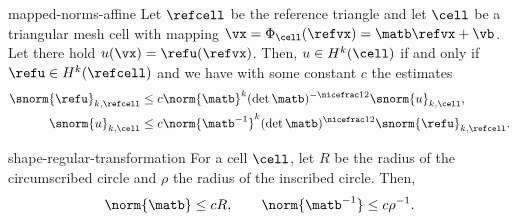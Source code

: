 \begin{Lemma}{mapped-norms-affine}
  Let $\refcell$ be the reference triangle and let $\cell$ be a
  triangular mesh cell with mapping
  $\vx = \Phi_\cell(\refvx) = \matb \refvx + \vb$. Let there hold
  $u(\vx) = \refu(\refvx)$. Then, $u\in H^k(\cell)$ if and only if
  $\refu\in H^k(\refcell)$ and we have with some constant $c$ the
  estimates
  \begin{gather}
    \begin{split}
      \snorm{\refu}_{k,\refcell}
      &\le c \norm{\matb}^k (\det \matb)^{-\nicefrac12}
      \snorm{u}_{k,\cell},\\
      \snorm{u}_{k,\cell}
      &\le c \norm{\matb^{-1}}^k (\det \matb)^{\nicefrac12}
      \snorm{\refu}_{k,\refcell}.
    \end{split}
  \end{gather}
\end{Lemma}

\begin{Lemma}{shape-regular-transformation}
  For a cell $\cell$, let $R$ be the radius of the circumscribed
  circle and $\rho$ the radius of the inscribed circle. Then,
  \begin{gather}
    \norm{\matb} \le c R, \qquad \norm{\matb^{-1}} \le c \rho^{-1}.
  \end{gather}
\end{Lemma}

